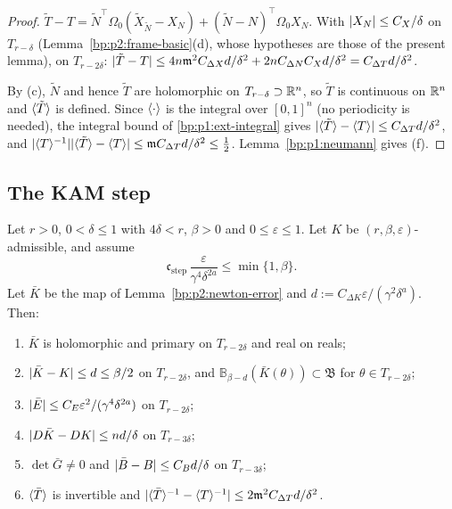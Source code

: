 \begin{proof}
\label{step:p2:pt-torsion}
$\tilde T-T=\tilde N^\top\Omega_0(\tilde X_{\tilde N}-X_N)+(\tilde N-N)^\top\Omega_0X_N$. With
$\lvert X_N\rvert\le C_X/\delta$ on $T_{r-\delta}$ (Lemma~\ref{bp:p2:frame-basic}(d), whose hypotheses are those
of the present lemma), on $T_{r-2\delta}$:
$\lvert \tilde T-T\rvert\le4n\mathfrak m^2C_{\Delta X}d/\delta^2+2nC_{\Delta N}C_Xd/\delta^2=C_{\Delta T}d/
\delta^2$.

\label{step:p2:pt-twist}
By (c), $\tilde N$ and hence $\tilde T$ are holomorphic on $T_{r-\delta}\supset\mathbb{R}^n$, so $\tilde T$ is
continuous on $\mathbb{R}^n$ and $\langle \tilde T\rangle$ is defined. Since $\langle \cdot\rangle$ is the integral over $[0,1]^n$
(no periodicity is needed), the integral bound of \ref{bp:p1:ext-integral} gives
$\lvert \langle \tilde T\rangle-\langle T\rangle\rvert\le C_{\Delta T}d/\delta^2$, and $\lvert \langle T\rangle^{-1}\rvert\lvert \langle \tilde T\rangle-\langle T\rangle\rvert\le\mathfrak mC_{\Delta T}d/\delta^2\le\frac12$. Lemma~\ref{bp:p1:neumann} gives (f).
\end{proof}

\subsection{The KAM step}\label{bp:p2:sec-step}

\begin{proposition}\label{bp:p2:step}
Let $r>0$, $0<\delta\le1$ with $4\delta<r$, $\beta>0$ and $0\le\varepsilon\le1$. Let $K$ be
$(r,\beta,\varepsilon)$-admissible, and assume
\[
\mathfrak c_{\mathrm{step}}\,\frac{\varepsilon}{\gamma^4\delta^{2a}}\le\min\{1,\beta\}.
\]
Let $\bar K$ be the map of Lemma~\ref{bp:p2:newton-error} and $d:=C_{\Delta K}\varepsilon/(\gamma^2
\delta^a)$. Then:
\begin{enumerate}[label=(\alph*)]
\item $\bar K$ is holomorphic and primary on $T_{r-2\delta}$ and real on reals;
\item $\lvert \bar K-K\rvert\le d\le\beta/2$ on $T_{r-2\delta}$, and $\mathbb B_{\beta-d}(\bar K(\theta))\subset
  \mathfrak B$ for $\theta\in T_{r-2\delta}$;
\item $\lvert \bar E\rvert\le C_E\varepsilon^2/(\gamma^4\delta^{2a})$ on $T_{r-2\delta}$;
\item $\lvert D\bar K-DK\rvert\le nd/\delta$ on $T_{r-3\delta}$;
\item $\det\bar G\ne0$ and $\lvert \bar B-B\rvert\le C_Bd/\delta$ on $T_{r-3\delta}$;
\item $\langle \bar T\rangle$ is invertible and $\lvert \langle \bar T\rangle^{-1}-\langle T\rangle^{-1}\rvert\le2\mathfrak m^2C_{\Delta T}
  d/\delta^2$.
\end{enumerate}
\end{proposition}

